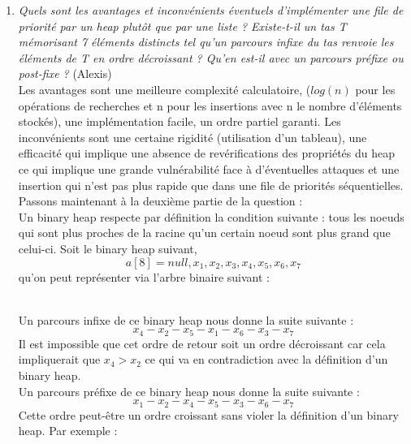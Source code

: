 \documentclass[11pt]{article}
\begin{document}
\begin{enumerate}
\item \textit{Quels sont les avantages et inconvénients éventuels d’implémenter une file de priorité par un heap plutôt que par une liste ? Existe-t-il un tas T mémorisant 7 éléments distincts tel qu’un parcours infixe du tas renvoie les éléments de T en ordre décroissant ? Qu’en est-il avec un parcours préfixe ou post-fixe ?} (Alexis)\\
Les avantages sont une meilleure complexité calculatoire, 
($log(n)$ pour les opérations de recherches et n pour les insertions avec n le nombre d'éléments stockés),
une implémentation facile, un ordre partiel garanti. Les inconvénients sont une certaine
rigidité (utilisation d'un tableau), une efficacité qui implique une absence de
revérifications des propriétés du heap ce qui implique une grande vulnérabilité face à
d'éventuelles attaques et une insertion qui n'est pas plus rapide que dans une file de
priorités séquentielles.\\
Passons maintenant à la deuxième partie de la question : \\
Un binary heap respecte par définition la condition suivante : tous les noeuds qui sont plus proches de la racine qu'un certain noeud sont plus grand que celui-ci.
Soit le binary heap suivant,
$$ a[8] = {null, x_1, x_2, x_3, x_4, x_5, x_6, x_7} $$
qu'on peut représenter via l'arbre binaire suivant :\\
\\
Un parcours infixe de ce binary heap nous donne la suite suivante :
$$ x_4 - x_2 - x_5 - x_1 - x_6 - x_3 - x_7 $$
Il est impossible que cet ordre de retour soit un ordre décroissant car cela impliquerait que $ x_4  > x_2 $ ce qui va en contradiction avec la définition d'un binary heap. \\
Un parcours préfixe de ce binary heap nous donne la suite suivante :
$$ x_1 - x_2 - x_4 - x_5 - x_3 - x_6 - x_7 $$
Cette ordre peut-être un ordre croissant sans violer la définition d'un binary heap. Par exemple : \\
\\


\end{enumerate}
\end{document}
